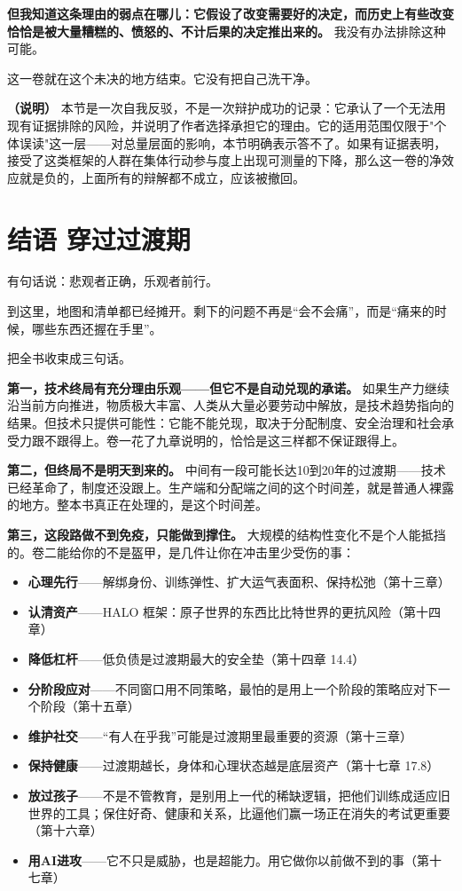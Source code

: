 \documentclass[11pt,a4paper]{ctexart}
\begin{document}
\textbf{但我知道这条理由的弱点在哪儿：它假设了改变需要好的决定，而历史上有些改变恰恰是被大量糟糕的、愤怒的、不计后果的决定推出来的。} 我没有办法排除这种可能。

这一卷就在这个未决的地方结束。它没有把自己洗干净。

\textbf{（说明）} 本节是一次自我反驳，不是一次辩护成功的记录：它承认了一个无法用现有证据排除的风险，并说明了作者选择承担它的理由。它的适用范围仅限于"个体误读"这一层——对总量层面的影响，本节明确表示答不了。如果有证据表明，接受了这类框架的人群在集体行动参与度上出现可测量的下降，那么这一卷的净效应就是负的，上面所有的辩解都不成立，应该被撤回。

\section{结语 \textperiodcentered{} 穿过过渡期}

有句话说：悲观者正确，乐观者前行。

到这里，地图和清单都已经摊开。剩下的问题不再是“会不会痛”，而是“痛来的时候，哪些东西还握在手里”。

把全书收束成三句话。

\textbf{第一，技术终局有充分理由乐观——但它不是自动兑现的承诺。} 如果生产力继续沿当前方向推进，物质极大丰富、人类从大量必要劳动中解放，是技术趋势指向的结果。但技术只提供可能性：它能不能兑现，取决于分配制度、安全治理和社会承受力跟不跟得上。卷一花了九章说明的，恰恰是这三样都不保证跟得上。

\textbf{第二，但终局不是明天到来的。} 中间有一段可能长达10到20年的过渡期——技术已经革命了，制度还没跟上。生产端和分配端之间的这个时间差，就是普通人裸露的地方。整本书真正在处理的，是这个时间差。

\textbf{第三，这段路做不到免疫，只能做到撑住。} 大规模的结构性变化不是个人能抵挡的。卷二能给你的不是盔甲，是几件让你在冲击里少受伤的事：

\begin{itemize}
  \item \textbf{心理先行}——解绑身份、训练弹性、扩大运气表面积、保持松弛（第十三章）
  \item \textbf{认清资产}——HALO 框架：原子世界的东西比比特世界的更抗风险（第十四章）
  \item \textbf{降低杠杆}——低负债是过渡期最大的安全垫（第十四章 14.4）
  \item \textbf{分阶段应对}——不同窗口用不同策略，最怕的是用上一个阶段的策略应对下一个阶段（第十五章）
  \item \textbf{维护社交}——“有人在乎我”可能是过渡期里最重要的资源（第十三章）
  \item \textbf{保持健康}——过渡期越长，身体和心理状态越是底层资产（第十七章 17.8）
  \item \textbf{放过孩子}——不是不管教育，是别用上一代的稀缺逻辑，把他们训练成适应旧世界的工具；保住好奇、健康和关系，比逼他们赢一场正在消失的考试更重要（第十六章）
  \item \textbf{用AI进攻}——它不只是威胁，也是超能力。用它做你以前做不到的事（第十七章）
\end{itemize}
\end{document}
